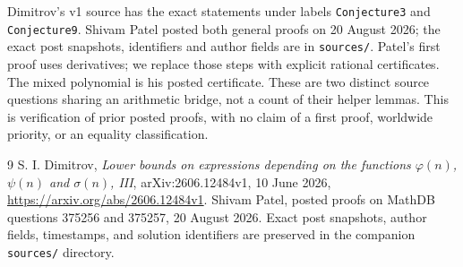 \documentclass[11pt]{article}
\begin{document}
Dimitrov's v1 source has the exact statements under labels
\texttt{Conjecture3} and \texttt{Conjecture9}.
Shivam Patel posted both general proofs on 20 August 2026; the exact
post snapshots, identifiers and author fields are in \texttt{sources/}.
Patel's first proof uses derivatives; we replace those steps with explicit
rational certificates. The mixed polynomial is his posted certificate.
These are two distinct source questions sharing an arithmetic bridge,
not a count of their helper lemmas. This is verification of prior posted
proofs, with no claim of a first proof, worldwide priority, or an equality
classification.

\begin{thebibliography}{9}
S. I. Dimitrov, \emph{Lower bounds on expressions depending on the
functions $\varphi(n)$, $\psi(n)$ and $\sigma(n)$, III},
arXiv:2606.12484v1, 10 June 2026,
\url{https://arxiv.org/abs/2606.12484v1}.
Shivam Patel, posted proofs on MathDB questions 375256 and 375257,
20 August 2026. Exact post snapshots, author fields, timestamps, and
solution identifiers are preserved in the companion \texttt{sources/}
directory.
\end{thebibliography}
\end{document}
